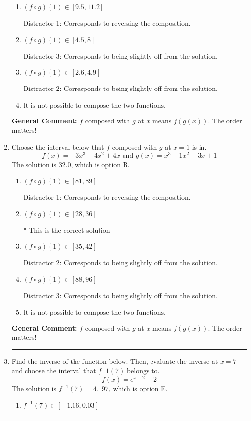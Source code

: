 \documentclass{extbook}[14pt]
\newcommand{\litem}[1]{\item #1

\rule{\textwidth}{0.4pt}}
\begin{document}
\begin{enumerate}
{\begin{enumerate}[label=\Alph*.]
* This is the correct solution
\item \( (f \circ g)(1) \in [9.5, 11.2] \)

 Distractor 1: Corresponds to reversing the composition.
\item \( (f \circ g)(1) \in [4.5, 8] \)

 Distractor 3: Corresponds to being slightly off from the solution.
\item \( (f \circ g)(1) \in [2.6, 4.9] \)

 Distractor 2: Corresponds to being slightly off from the solution.
\item \( \text{It is not possible to compose the two functions.} \)


\end{enumerate}

\textbf{General Comment:} $f$ composed with $g$ at $x$ means $f(g(x))$. The order matters!
}
\litem{
Choose the interval below that $f$ composed with $g$ at $x=1$ is in.
\[ f(x) = -3x^{3} +4 x^{2} +4 x \text{ and } g(x) = x^{3} -1 x^{2} -3 x + 1 \]The solution is \( 32.0 \), which is option B.\begin{enumerate}[label=\Alph*.]
\item \( (f \circ g)(1) \in [81, 89] \)

 Distractor 1: Corresponds to reversing the composition.
\item \( (f \circ g)(1) \in [28, 36] \)

* This is the correct solution
\item \( (f \circ g)(1) \in [35, 42] \)

 Distractor 2: Corresponds to being slightly off from the solution.
\item \( (f \circ g)(1) \in [88, 96] \)

 Distractor 3: Corresponds to being slightly off from the solution.
\item \( \text{It is not possible to compose the two functions.} \)


\end{enumerate}

\textbf{General Comment:} $f$ composed with $g$ at $x$ means $f(g(x))$. The order matters!
}
\litem{
Find the inverse of the function below. Then, evaluate the inverse at $x = 7$ and choose the interval that $f^-1(7)$ belongs to.
\[ f(x) = e^{x-2}-2 \]The solution is \( f^{-1}(7) = 4.197 \), which is option E.\begin{enumerate}[label=\Alph*.]
\item \( f^{-1}(7) \in [-1.06, 0.03] \)


\end{enumerate}}
\end{enumerate}
\end{document}
